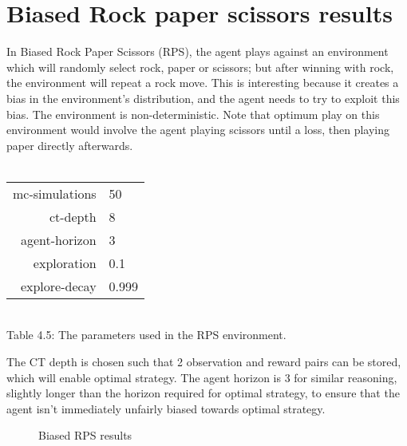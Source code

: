 \documentclass[pdftex,twoside,a4paper]{report}
\begin{document}
\section{Biased Rock paper scissors results}
In Biased Rock Paper Scissors (RPS), the agent plays against an environment which will randomly select rock, paper or scissors; but after winning with rock, the environment will repeat a rock move. This is interesting because it creates a bias in the environment's distribution, and the agent needs to try to exploit this bias. The environment is non-deterministic. Note that optimum play on this environment would involve the agent playing scissors until a loss, then playing paper directly afterwards. \\\\
\begin{center}
\begin{tabular}{| r | l | }
\hline
mc-simulations & 50\\
ct-depth & 8\\
agent-horizon & 3\\
exploration & 0.1\\
explore-decay & 0.999\\
\hline
\end{tabular}\\
\vspace{0.5mm}
Table 4.5: The parameters used in the RPS environment.
\end{center}
The CT depth is chosen such that 2 observation and reward pairs can be stored, which will enable optimal strategy. The agent horizon is 3 for similar reasoning, slightly longer than the horizon required for optimal strategy, to ensure that the agent isn't immediately unfairly biased towards optimal strategy.
\begin{figure}[h]
  \begin{center}
  \end{center}
  \caption{Biased RPS results}
  \label{fig:rps_results}
\end{figure}
\end{document}
